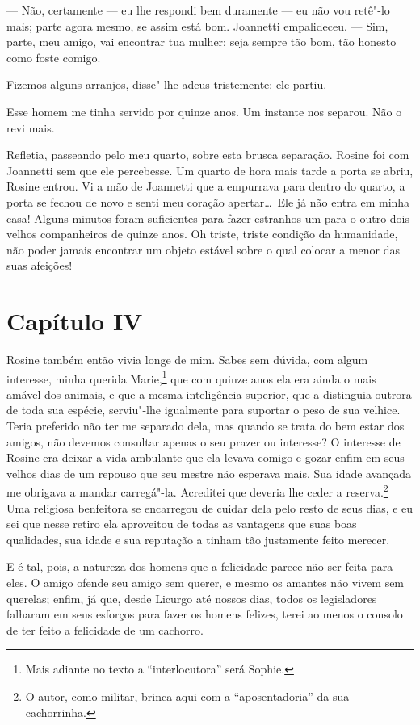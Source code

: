 --- Não, certamente --- eu lhe respondi bem duramente --- eu não vou retê"-lo
mais; parte agora mesmo, se assim está bom. 
Joannetti empalideceu. --- Sim, parte, meu amigo, vai encontrar tua mulher; 
seja sempre tão bom, tão honesto como foste comigo.

 Fizemos alguns arranjos, disse"-lhe adeus tristemente: ele partiu.

 Esse homem me tinha servido por quinze anos. Um instante nos separou.
Não o revi mais.

 Refletia, passeando pelo meu quarto, sobre esta brusca separação.
Rosine foi com Joannetti sem que ele percebesse. Um quarto de hora mais
tarde a porta se abriu, Rosine entrou. Vi a mão de Joannetti que a
empurrava para dentro do quarto, a porta se fechou de novo e senti meu
coração apertar\ldots\  Ele já não entra em minha casa! Alguns minutos
foram suficientes para fazer estranhos um para o outro dois velhos
companheiros de quinze anos. Oh triste, triste condição da humanidade,
não poder jamais encontrar um objeto estável sobre o qual colocar a
menor das suas afeições!

\section*{Capítulo IV}

 Rosine também então vivia longe de mim. Sabes sem dúvida, com algum
interesse, minha querida Marie,\footnote{ Mais adiante no texto a
``interlocutora'' será Sophie.} que com quinze anos ela era ainda o mais
amável dos animais, e que a mesma inteligência superior, que a
distinguia outrora de toda sua espécie, serviu"-lhe igualmente para
suportar o peso de sua velhice. Teria preferido não ter me separado
dela, mas quando se trata do bem estar dos amigos, não devemos
consultar apenas o seu prazer ou interesse? O interesse de Rosine era
deixar a vida ambulante que ela levava comigo e gozar enfim em seus
velhos dias de um repouso que seu mestre não esperava mais. Sua idade
avançada me obrigava a mandar carregá"-la. Acreditei que deveria lhe
ceder a reserva.\footnote{ O autor, como militar, brinca aqui com a
``aposentadoria'' da sua cachorrinha.} Uma religiosa benfeitora se
encarregou de cuidar dela pelo resto de seus dias, e eu sei que nesse
retiro ela aproveitou de todas as vantagens que suas boas qualidades,
sua idade e sua reputação a tinham tão justamente feito merecer. 

 E é tal, pois, a natureza dos homens que a felicidade parece não ser
feita para eles. O amigo ofende seu amigo sem querer, e mesmo os
amantes não vivem sem querelas; enfim, já que, desde Licurgo até nossos
dias, todos os legisladores falharam em seus esforços para fazer os
homens felizes, terei ao menos o consolo de ter feito a felicidade de
um cachorro.

